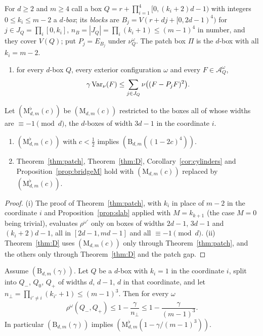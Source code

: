For $d\ge2$ and $m\ge4$ call a box $Q=r+\prod_{i=1}^4[0,(k_i+2)d-1)$ with
integers $0\le k_i\le m-2$ a \emph{$d$-box}; its \emph{blocks} are $B_j=
V(r+dj+[0,2d-1)^4)$ for $j\in J_Q=\prod_i[0,k_i]$, $n_B=|J_Q|=\prod_i(k_i+1)
\le(m-1)^4$ in number, and they cover $V(Q)$; put $P_j=E_{B_j}$ under
$\nu^\omega_Q$. The patch box $\Pi$ is the $d$-box with all $k_i=m-2$.
\begin{enumerate}[label=\textup{(B$_{d,m}(\gamma)$)},leftmargin=*]
\item for every $d$-box $Q$, every exterior configuration $\omega$ and every
$F\in\mathcal A^\omega_Q$,
\[
\gamma\operatorname{Var}_{\nu}(F)\le\sum_{j\in J_Q}\nu\bigl((F-P_jF)^2\bigr).
\]
\end{enumerate}
Let $(\mathrm M^\flat_{d,m}(c))$ be $(\mathrm M_{d,m}(c))$ restricted to the
boxes all of whose widths are $\equiv-1\pmod d$, the $d$-boxes of width
$3d-1$ in the coordinate $i$.

\begin{lemma}\label{lem:flatboxes}
\begin{enumerate}[label=\textup{(\roman*)},leftmargin=*]
\item $(\mathrm M^\flat_{d,m}(c))$ with $c<\frac12$ implies
$(\mathrm B_{d,m}((1-2c)^4))$.
\item Theorem~\ref{thm:patch}, Theorem~\ref{thm:D},
Corollary~\ref{cor:cylinders} and Proposition~\ref{prop:bridgeM} hold with
$(\mathrm M_{d,m}(c))$ replaced by $(\mathrm M^\flat_{d,m}(c))$.
\end{enumerate}
\end{lemma}

\begin{proof}
(i) The proof of Theorem~\ref{thm:patch}, with $k_i$ in place of $m-2$ in
the coordinate $i$ and Proposition~\ref{prop:slab} applied with $M=k_{k+1}$
(the case $M=0$ being trivial), evaluates $\rho^{\omega'}$ only on boxes of
widths $2d-1$, $3d-1$ and $(k_i+2)d-1$, all in $[2d-1,md-1]$ and all
$\equiv-1\pmod d$. (ii) Theorem~\ref{thm:D} uses $(\mathrm M_{d,m}(c))$
only through Theorem~\ref{thm:patch}, and the others only through
Theorem~\ref{thm:D} and the patch gap.
\end{proof}

\begin{proposition}
\label{prop:blockslab}
Assume $(\mathrm B_{d,m}(\gamma))$. Let $Q$ be a $d$-box with $k_i=1$ in the
coordinate $i$, split into $Q_-$, $Q_0$, $Q_+$ of widths $d$, $d-1$, $d$ in
that coordinate, and let $n_\perp=\prod_{i'\ne i}(k_{i'}+1)\le(m-1)^3$. Then
for every $\omega$
\[
\rho^\omega(Q_-,Q_+)\le1-\frac{\gamma}{n_\perp}\le1-\frac{\gamma}{(m-1)^3}.
\]
In particular $(\mathrm B_{d,m}(\gamma))$ implies $(\mathrm M^\flat_{d,m}(1-
\gamma/(m-1)^3))$.
\end{proposition}

